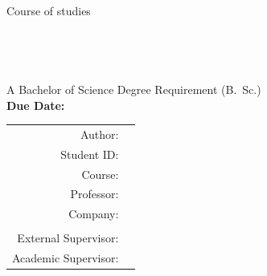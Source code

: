 \begin{titlepage}
\begin{center}
		\large{Course of studies}\\
		\large{\textbf{\courseofstudies}}\\
		\vspace{1.0cm}
		\huge{\textsc{\textbf{\mytitle}}}\\
		\Large{\textbf{\mysubtitle}}\\
		\vspace{1.0cm}
		\large{\textbf{\type}}\\
		\vspace{1.0cm}
		\normalsize{A Bachelor of Science Degree Requirement (B.~Sc.)}\\
		\vspace{1.0cm}
		\textbf{Due Date: \duedate} \\
		\vspace{2.0cm}
		\begin{tabular}{rl}
			Author:								& \myauthor \\
			Student ID:						& \matrikelnr \\
			Course: 							& \course \\ 
			Professor:						& \professor \\
			Company: 							& \company \\ \\
			External Supervisor: 	& \supervisor \\
			Academic Supervisor:	& \secondsupervisor \\
		\end{tabular} 
	\end{center}
\end{titlepage}